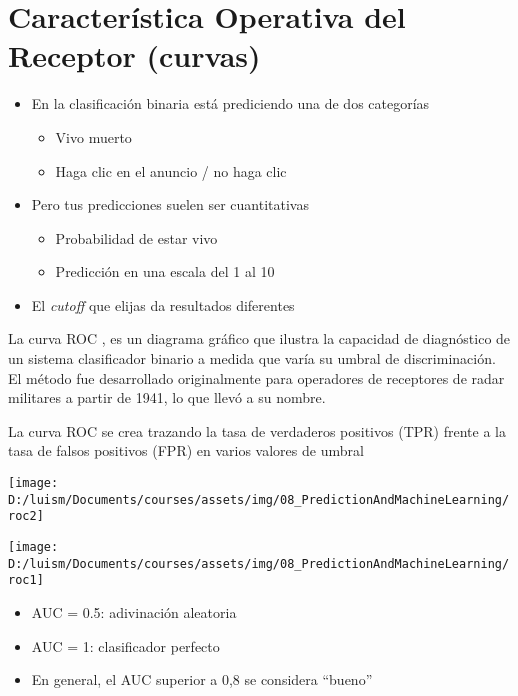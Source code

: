 \documentclass[
]{article}
\providecommand{\tightlist}{%
  \setlength{\itemsep}{0pt}\setlength{\parskip}{0pt}}
\begin{document}
\hypertarget{caracteruxedstica-operativa-del-receptor-curvas}{%
\section{Característica Operativa del Receptor
(curvas)}\label{caracteruxedstica-operativa-del-receptor-curvas}}

\begin{itemize}
\tightlist
\item
  En la clasificación binaria está prediciendo una de dos categorías

  \begin{itemize}
  \tightlist
  \item
    Vivo muerto
  \item
    Haga clic en el anuncio / no haga clic
  \end{itemize}
\item
  Pero tus predicciones suelen ser cuantitativas

  \begin{itemize}
  \tightlist
  \item
    Probabilidad de estar vivo
  \item
    Predicción en una escala del 1 al 10
  \end{itemize}
\item
  El \emph{cutoff} que elijas da resultados diferentes
\end{itemize}

La curva ROC , es un diagrama gráfico que ilustra la capacidad de
diagnóstico de un sistema clasificador binario a medida que varía su
umbral de discriminación. El método fue desarrollado originalmente para
operadores de receptores de radar militares a partir de 1941, lo que
llevó a su nombre.

La curva ROC se crea trazando la tasa de verdaderos positivos (TPR)
frente a la tasa de falsos positivos (FPR) en varios valores de umbral

\begin{center}\texttt{[image: D:/luism/Documents/courses/assets/img/08\_PredictionAndMachineLearning/roc2]} \end{center}

\begin{center}\texttt{[image: D:/luism/Documents/courses/assets/img/08\_PredictionAndMachineLearning/roc1]} \end{center}

\begin{itemize}
\tightlist
\item
  AUC = 0.5: adivinación aleatoria
\item
  AUC = 1: clasificador perfecto
\item
  En general, el AUC superior a 0,8 se considera ``bueno''
\end{itemize}
\end{document}

